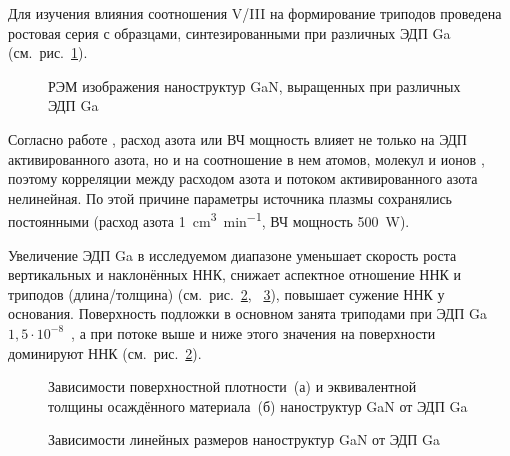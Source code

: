 Для изучения влияния соотношения V/III на формирование триподов проведена
ростовая серия с образцами, синтезированными при различных ЭДП Ga
(см.~рис.~\cref{fig:Image_23}).

\begin{figure}[ht]   \caption{РЭМ изображения наноструктур GaN,
		выращенных при различных ЭДП Ga}\label{fig:Image_23} \end{figure}

Согласно работе \cite{Voulot1998}, расход азота или ВЧ мощность влияет не
только на ЭДП активированного азота, но и на соотношение в нем атомов, молекул
и ионов \cite{Blant2000}, поэтому корреляции между расходом азота и потоком
активированного азота нелинейная. По этой причине параметры источника плазмы
сохранялись постоянными (расход азота 1~\si{\centi\meter^3\per\minute}, ВЧ
мощность 500~\si{\watt}).

Увеличение ЭДП Ga в исследуемом диапазоне уменьшает скорость роста вертикальных
и наклонённых ННК, снижает аспектное отношение ННК и триподов (длина/толщина)
(см.~рис.~\cref{fig:Image_24_1},~ \cref{fig:Image_24_2}), повышает сужение ННК
у основания. Поверхность подложки в основном занята триподами при ЭДП Ga \(1,5
\cdot 10^{-8}\)~\si{\torr}, а при потоке выше и ниже этого значения на
поверхности доминируют ННК (см.~рис.~\cref{fig:Image_24_1}).

\begin{figure}[ht] 
			\caption{Зависимости поверхностной плотности~(а) и эквивалентной толщины
			осаждённого материала~(б) наноструктур GaN от ЭДП
		Ga}\label{fig:Image_24_1} \end{figure}

\begin{figure}[ht]  \caption{Зависимости
линейных размеров наноструктур GaN от ЭДП Ga}\label{fig:Image_24_2}
\end{figure}


